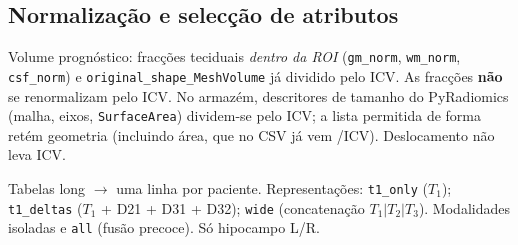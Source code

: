 \documentclass[review]{elsarticle}
\newcommand{\code}[1]{\texttt{#1}}
\begin{document}
	\subsection{Normalização e selecção de atributos}
	\label{sec:feature-selection}
	
	Volume prognóstico: fracções teciduais \emph{dentro da ROI} (\code{gm\_norm}, \code{wm\_norm}, \code{csf\_norm}) e \code{original\_shape\_MeshVolume} já dividido pelo ICV.
	As fracções \textbf{não} se renormalizam pelo ICV.
	No armazém, descritores de tamanho do PyRadiomics (malha, eixos, \code{SurfaceArea}) dividem-se pelo ICV; a lista permitida de forma retém geometria (incluindo área, que no CSV já vem /ICV).
	Deslocamento não leva ICV.
	
	Tabelas long $\to$ uma linha por paciente.
	Representações: \code{t1\_only} ($T_1$); \code{t1\_deltas} ($T_1$ + D21 + D31 + D32); \code{wide} (concatenação $T_1|T_2|T_3$).
	Modalidades isoladas e \code{all} (fusão precoce). Só hipocampo L/R.
	
\end{document}
